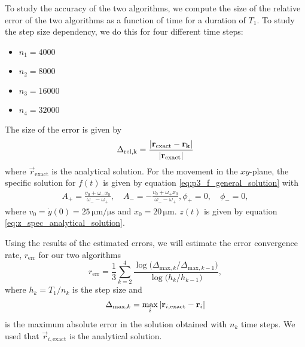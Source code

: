 To study the accuracy of the two algorithms, we compute the size of the relative error of the two algorithms as a function of time for a duration of $T_1$. To study the step size dependency, we do this for four different time steps:
\begin{itemize}
    \item[] $n_1 = 4000$
    \item[] $n_2 = 8000$
    \item[] $n_3 = 16000$
    \item[] $n_4 = 32000$
\end{itemize}
The size of the error is given by 
\begin{equation}\label{eq:relative_error_size}
    \Delta_\mathrm{rel,k} = \frac{\abs{\mathbf{r}_\mathrm{exact} - \mathbf{r_k}}}{\abs{\mathbf{r}_\mathrm{exact}}}
\end{equation}
where $\vec{r}_\mathrm{exact}$ is the analytical solution. For the movement in the $xy$-plane, the specific solution for $f(t)$ is given by equation \eqref{eq:p3_f_general_solution} with 
\begin{equation} \label{eq:xy_amplitudes_spec_analytical_solution}
    \begin{split}
        A_+ = \frac{v_0 + \omega_- x_0}{\omega_- - \omega_+},\quad A_- = - \frac{v_0 + \omega_+ x_0}{\omega_- - \omega_+},
        \phi_+ =0,\quad \phi_- =0,
    \end{split}
\end{equation}
where $v_0=\dot{y}(0)=25\,\mathrm{\mu m / \mu s}$ and $x_0=20\,\mathrm{\mu m}$. $z(t)$ is given by equation \eqref{eq:z_spec_analytical_solution}.




Using the results of the estimated errors, we will estimate the error convergence rate, $r_\mathrm{err}$ for our two algorithms 
\begin{equation}\label{eq:error_convergence_rate}
    r_\mathrm{err} = \frac{1}{3} \sum_{k=2}^{4} \frac{\log{\big(\Delta_{\mathrm{max}, k} /\Delta_{\mathrm{max}, k-1}\big)}}{\log{\big(h_k/h_{k-1} \big)}},
\end{equation}
where $h_k =T_1/n_k$ is the step size and
\begin{equation}\label{eq:abs_error}
    \Delta_{\mathrm{max}, k} = \max_{i}\abs{\mathbf{r}_{i, \mathrm{exact}} - \mathbf{r}_i}
\end{equation}
is the maximum absolute error in the solution obtained with $n_k$ time steps. We used that $\vec{r}_{i, \mathrm{exact}}$ is the analytical solution.

